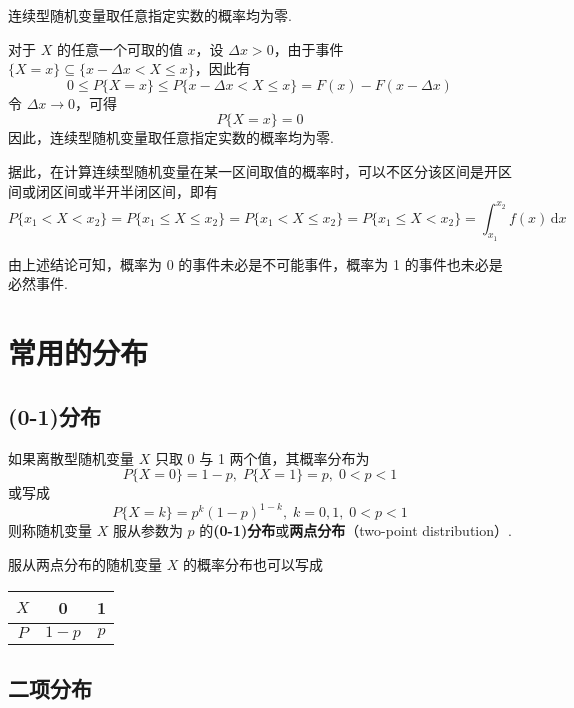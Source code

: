 \begin{conclusion}
    连续型随机变量取任意指定实数的概率均为零.
\end{conclusion}

\begin{myproof}
    对于 $X$ 的任意一个可取的值 $x$，设 $\Delta x > 0$，由于事件 $\{X=x\} \subseteq \{x - \Delta x < X \leqslant x\}$，因此有
    $$
    0 \leqslant P\{X=x\} \leqslant P\{x - \Delta x < X \leqslant x\} = F(x)-F(x-\Delta x)
    $$
    令 $\Delta x \to 0$，可得
    $$
    P\{X=x\}=0
    $$
    因此，连续型随机变量取任意指定实数的概率均为零.
\end{myproof}


据此，在计算连续型随机变量在某一区间取值的概率时，可以不区分该区间是开区间或闭区间或半开半闭区间，即有
$$
P\{x_1 < X < x_2\} = P\{x_1 \leqslant X \leqslant x_2\} = P\{x_1 < X \leqslant x_2\} = P\{x_1 \leqslant X < x_2\} = \int_{x_1}^{x_2} f(x)\,\text{d}x
$$

由上述结论可知，概率为 0 的事件未必是不可能事件，概率为 1 的事件也未必是必然事件.

\section{常用的分布}

\subsection{(0-1)分布}

\begin{definition}
    如果离散型随机变量 $X$ 只取 0 与 1 两个值，其概率分布为
    $$
    P\{X=0\}=1-p, \; P\{X=1\}=p, \; 0<p<1
    $$
    或写成
    $$
    P\{X=k\}=p^k (1-p)^{1-k}, \; k=0,1, \; 0<p<1
    $$
    则称随机变量 $X$ 服从参数为 $p$ 的\textbf{(0-1)分布}或\textbf{两点分布}（two-point distribution）.
\end{definition}

服从两点分布的随机变量 $X$ 的概率分布也可以写成
\begin{table*}[htbp]
    \centering

    \begin{tabular}{c | c c}
        \hline
        $X$ & 0 & 1 \\
        \hline
        $P$ & $1-p$ & $p$ \\
        \hline
    \end{tabular}
\end{table*}

\subsection{二项分布}


